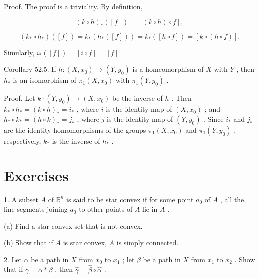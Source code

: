 \documentclass[10pt]{article}
\begin{document}
Proof. The proof is a triviality. By definition,

\[
{\left( k \circ  h\right) }_{ * }\left( \left\lbrack  f\right\rbrack  \right)  = \left\lbrack  {\left( {k \circ  h}\right)  \circ  f}\right\rbrack  ,
\]

\[
\left( {{k}_{ * } \circ  {h}_{ * }}\right) \left( \left\lbrack  f\right\rbrack  \right)  = {k}_{ * }\left( {{h}_{ * }\left( \left\lbrack  f\right\rbrack  \right) }\right)  = {k}_{ * }\left( \left\lbrack  {h \circ  f}\right\rbrack  \right)  = \left\lbrack  {k \circ  \left( {h \circ  f}\right) }\right\rbrack  .
\]

Simularly, \({i}_{ * }\left( \left\lbrack  f\right\rbrack  \right)  = \left\lbrack  {i \circ  f}\right\rbrack   = \left\lbrack  f\right\rbrack\)

Corollary 52.5. If \(h : \left( {X,{x}_{0}}\right)  \rightarrow  \left( {Y,{y}_{0}}\right)\) is a homeomorphism of \(X\) with \(Y\) , then \({h}_{ * }\) is an isomorphism of \({\pi }_{1}\left( {X,{x}_{0}}\right)\) with \({\pi }_{1}\left( {Y,{y}_{0}}\right)\) .

Proof. Let \(k \cdot  \left( {Y,{y}_{0}}\right)  \rightarrow  \left( {X,{x}_{0}}\right)\) be the inverse of \(h\) . Then \({k}_{ * } \circ  {h}_{ * } = {\left( k \circ  h\right) }_{ * } = {i}_{ * }\) , where \(i\) is the identity map of \(\left( {X,{x}_{0}}\right)\) ; and \({h}_{ * } \circ  {k}_{ * } = {\left( h \circ  k\right) }_{ * } = {j}_{ * }\) , where \(j\) is the identity map of \(\left( {Y,{y}_{0}}\right)\) . Since \({i}_{ * }\) and \({j}_{ * }\) are the identity homomorphisms of the groups \({\pi }_{1}\left( {X,{x}_{0}}\right)\) and \({\pi }_{1}\left( {Y,{y}_{0}}\right)\) , respectively, \({k}_{ * }\) is the inverse of \({h}_{ * }\) .

\section*{Exercises}

1. A subset \(A\) of \({\mathbb{R}}^{n}\) is said to be star convex if for some point \({a}_{0}\) of \(A\) , all the line segments joining \({a}_{0}\) to other points of \(A\) lie in \(A\) .

(a) Find a star convex set that is not convex.

(b) Show that if \(A\) is star convex, \(A\) is simply connected.

2. Let \(\alpha\) be a path in \(X\) from \({x}_{0}\) to \({x}_{1}\) ; let \(\beta\) be a path in \(X\) from \({x}_{1}\) to \({x}_{2}\) . Show that if \(\gamma  = \alpha  * \beta\) , then \(\widehat{\gamma } = \widehat{\beta } \circ  \widehat{\alpha }\) .
\end{document}
